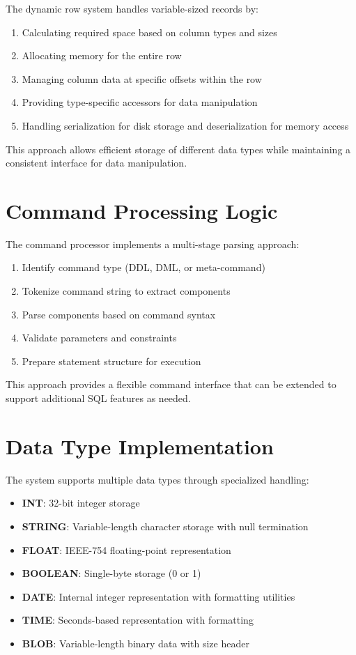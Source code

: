 \documentclass[12pt,a4paper]{article}  %
\begin{document}
The dynamic row system handles variable-sized records by:

\begin{enumerate}
    \item Calculating required space based on column types and sizes
    \item Allocating memory for the entire row
    \item Managing column data at specific offsets within the row
    \item Providing type-specific accessors for data manipulation
    \item Handling serialization for disk storage and deserialization for memory access
\end{enumerate}

This approach allows efficient storage of different data types while maintaining a consistent interface for data manipulation.

\section{Command Processing Logic}

The command processor implements a multi-stage parsing approach:

\begin{enumerate}
    \item Identify command type (DDL, DML, or meta-command)
    \item Tokenize command string to extract components
    \item Parse components based on command syntax
    \item Validate parameters and constraints
    \item Prepare statement structure for execution
\end{enumerate}

This approach provides a flexible command interface that can be extended to support additional SQL features as needed.

\section{Data Type Implementation}

The system supports multiple data types through specialized handling:

\begin{itemize}
    \item \textbf{INT}: 32-bit integer storage
    \item \textbf{STRING}: Variable-length character storage with null termination
    \item \textbf{FLOAT}: IEEE-754 floating-point representation
    \item \textbf{BOOLEAN}: Single-byte storage (0 or 1)
    \item \textbf{DATE}: Internal integer representation with formatting utilities
    \item \textbf{TIME}: Seconds-based representation with formatting
    \item \textbf{BLOB}: Variable-length binary data with size header
\end{itemize}
\end{document}
